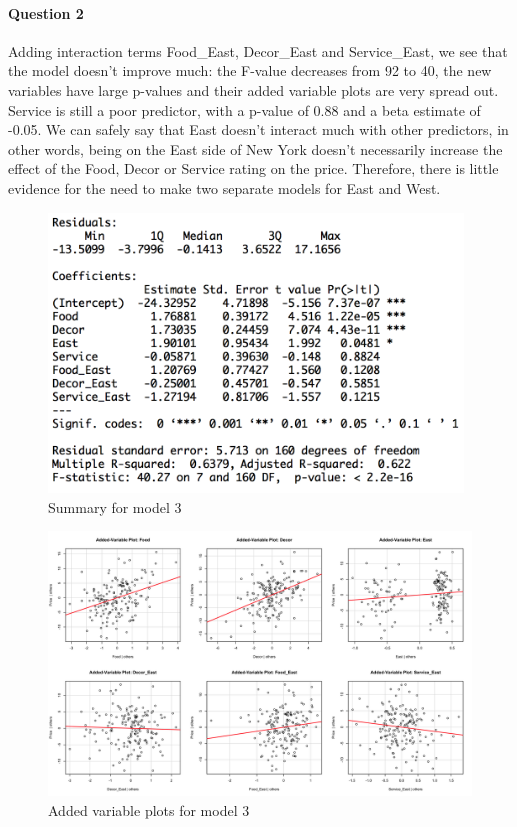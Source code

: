 \documentclass{article}
\begin{document}
\paragraph{Question 2}
Adding interaction terms Food\_East, Decor\_East and Service\_East, we see that the model doesn't improve much: the F-value decreases from 92 to 40, the new variables have large p-values and their added variable plots are very spread out. Service is still a poor predictor, with a p-value of 0.88 and a beta estimate of -0.05. We can safely say that East doesn't interact much with other predictors, in other words, being on the East side of New York doesn't necessarily increase the effect of the Food, Decor or Service rating on the price. Therefore, there is little evidence for the need to make two separate models for East and West.

\begin{figure}[h!]				
	\centering
	\includegraphics[width=11cm]{Part2_summary_model3}
	\caption{Summary for model 3}
\end{figure}

\begin{figure}[h!]				
	\centering
	\includegraphics[width=16cm]{Part2_avplots_interaction}
	\caption{Added variable plots for model 3}
\end{figure}
\end{document}
